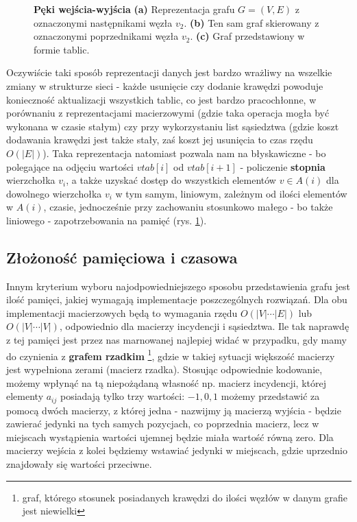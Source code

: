 \begin{figure}[!htbp]
\begin{subfigure}[b]{0.50\textwidth}
		\caption{}
	\end{subfigure}
	\caption{\textbf{Pęki wejścia-wyjścia} \textbf{(a)} Reprezentacja grafu $G = \left( V, E \right)$ z oznaczonymi następnikami węzła $v_{2}$. \textbf{(b)} Ten sam graf skierowany z oznaczonymi poprzednikami węzła $v_{2}$. \textbf{(c)} Graf przedstawiony w formie tablic.}\label{fig:forwardReverseStarRepresentation}
\end{figure}

Oczywiście taki sposób reprezentacji danych jest bardzo wrażliwy na wszelkie zmiany w strukturze sieci - każde usunięcie czy dodanie krawędzi powoduje konieczność aktualizacji wszystkich tablic, co jest bardzo pracochłonne, w porównaniu z reprezentacjami macierzowymi (gdzie taka operacja mogła być wykonana w czasie stałym) czy przy wykorzystaniu list sąsiedztwa (gdzie koszt dodawania krawędzi jest także stały, zaś koszt jej usunięcia to czas rzędu $ O \left( \left| E \right| \right) $). Taka reprezentacja natomiast pozwala nam na błyskawiczne - bo polegające na odjęciu wartości $vtab \left[ i \right] $ od $vtab \left[ i+1 \right] $ - policzenie \textbf{stopnia} wierzchołka $v_{i}$, a także uzyskać dostęp do wszystkich elementów $ v \in A \left( i \right) $ dla dowolnego wierzchołka $v_{i}$ w tym samym, liniowym, zależnym od ilości elementów w $A \left( i \right) $, czasie, jednocześnie przy zachowaniu stosunkowo małego - bo także liniowego - zapotrzebowania na pamięć (rys. \ref{fig:forwardReverseStarRepresentation}).

\subsection{Złożoność pamięciowa i czasowa}

Innym kryterium wyboru najodpowiedniejszego sposobu przedstawienia grafu jest ilość pamięci, jakiej wymagają implementacje poszczególnych rozwiązań. Dla obu implementacji macierzowych będą to wymagania rzędu $O \left( \left| V \right| \cdots \left| E \right| \right)$ lub $O \left( \left| V \right| \cdots \left| V \right| \right)$, odpowiednio dla macierzy incydencji i sąsiedztwa. Ile tak naprawdę z tej pamięci jest przez nas marnowanej najlepiej widać w przypadku, gdy mamy do czynienia z \textbf{grafem rzadkim} \footnote{graf, którego stosunek posiadanych krawędzi do ilości węzłów w danym grafie jest niewielki}, gdzie w takiej sytuacji większość macierzy jest wypełniona zerami (macierz rzadka). Stosując odpowiednie kodowanie, możemy wpłynąć na tą niepożądaną własność np. macierz incydencji, której elementy $a_{ij}$ posiadają tylko trzy wartości: $-1, 0, 1$ możemy przedstawić za pomocą dwóch macierzy, z której jedna - nazwijmy ją macierzą wyjścia - będzie zawierać jedynki na tych samych pozycjach, co poprzednia macierz, lecz w miejscach wystąpienia wartości ujemnej będzie miała wartość równą zero. Dla macierzy wejścia z kolei będziemy wstawiać jedynki w miejscach, gdzie uprzednio znajdowały się wartości przeciwne.

